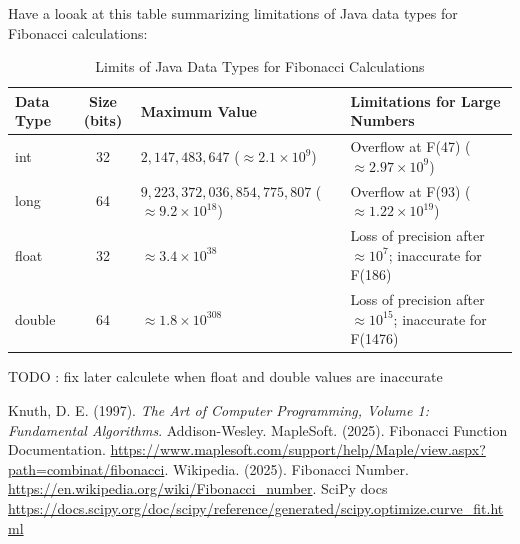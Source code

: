 \documentclass{article}
\begin{document}
Have a looak at this table summarizing limitations of Java data types for Fibonacci calculations:
\begin{table}[h]
\centering
\small
\caption{Limits of Java Data Types for Fibonacci Calculations}
\begin{tabularx}{\textwidth}{l c X X}
\toprule
\textbf{Data Type} & \textbf{Size (bits)} & \textbf{Maximum Value} & \textbf{Limitations for Large Numbers} \\
\midrule
int & 32 & $2,147,483,647$ ($\approx 2.1 \times 10^9$) & Overflow at F(47) ($\approx 2.97 \times 10^9$) \\
long & 64 & $9,223,372,036,854,775,807$ ($\approx 9.2 \times 10^{18}$) & Overflow at F(93) ($\approx 1.22 \times 10^{19}$) \\
float & 32 & $\approx 3.4 \times 10^{38}$ & Loss of precision after $\approx 10^7$; inaccurate for F(186) \\
double & 64 & $\approx 1.8 \times 10^{308}$ & Loss of precision after $\approx 10^{15}$; inaccurate for F(1476) \\
\bottomrule
\end{tabularx}
\end{table}
TODO : fix later calculete when float and double values are inaccurate




\begin{thebibliography}{9}
Knuth, D. E. (1997). \textit{The Art of Computer Programming, Volume 1: Fundamental Algorithms}. Addison-Wesley.
MapleSoft. (2025). Fibonacci Function Documentation. \url{https://www.maplesoft.com/support/help/Maple/view.aspx?path=combinat/fibonacci}.
Wikipedia. (2025). Fibonacci Number. \url{https://en.wikipedia.org/wiki/Fibonacci_number}.
SciPy docs \url{https://docs.scipy.org/doc/scipy/reference/generated/scipy.optimize.curve_fit.html}
\end{thebibliography}
\end{document}
